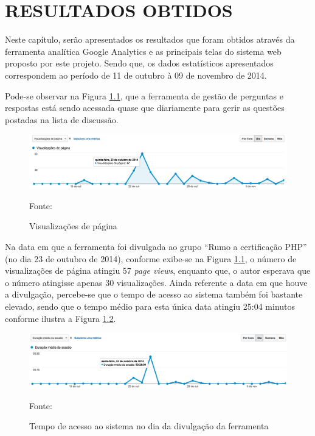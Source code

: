 \chapter{RESULTADOS OBTIDOS}
\label{chp:resultadosObtidos}
 
Neste capítulo, serão apresentados os resultados que foram obtidos através da
ferramenta analítica \acs{Google Analytics} e as principais telas do sistema
web proposto por este projeto. Sendo que, os dados estatísticos apresentados
correspondem ao período de 11 de outubro à 09 de novembro de 2014.

Pode-se observar na Figura \ref{fig:googleAnalyticsGrafico}, que a
ferramenta de gestão de perguntas e respostas está sendo acessada quase
que diariamente para gerir as questões postadas na lista de discussão.

\begin{figure}[h!tb]
	\caption{Visualizações de página}
	\label{fig:googleAnalyticsGrafico}

	\centering
	\includegraphics[width=\textwidth]{images/resultados/google-analytics-grafico.png}

	\centering
	\footnotesize Fonte: \fonteOAutor
\end{figure}

\FloatBarrier 	%

Na data em que a ferramenta foi divulgada ao grupo ``Rumo a certificação PHP''
(no dia 23 de outubro de 2014), conforme exibe-se na Figura
\ref{fig:googleAnalyticsGrafico}, o número de visualizações de página atingiu 
57 \textit{page views}, enquanto que, o autor esperava que o número atingisse
apenas 30 visualizações. Ainda referente a data em que houve a divulgação, 
percebe-se que o tempo de acesso ao sistema também foi bastante elevado, sendo
que o tempo médio para esta única data atingiu 25:04 minutos conforme ilustra a 
Figura \ref{fig:googleAnalyticsTempoAcessoDivulgacao}.

\begin{figure}[h!tb]
	\caption{Tempo de acesso ao sistema no dia da divulgação da ferramenta}
	\label{fig:googleAnalyticsTempoAcessoDivulgacao}

	\centering
	\includegraphics[width=\textwidth]{images/resultados/google-analytics-tempoacesso-divulgacao.png}

	\centering
	\footnotesize Fonte: \fonteOAutor
\end{figure}


